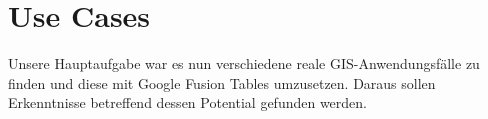 

\chapter*{Use Cases}
Unsere Hauptaufgabe war es nun verschiedene reale GIS-Anwendungsfälle zu finden und diese mit Google Fusion Tables umzusetzen. Daraus sollen Erkenntnisse betreffend dessen Potential gefunden werden.



